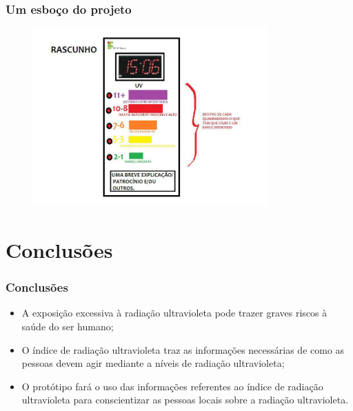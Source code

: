 \documentclass{beamer}
\begin{document}
	\begin{frame}
		\frametitle{Um esboço do projeto}
		\begin{figure}[htb]
					\includegraphics[width=0.8\textwidth]{img/toten_prot.jpg}
				\end{figure}
	\end{frame}
	
	\section{Conclusões}
	\begin{frame}
		\frametitle{Conclusões}
		\begin{itemize}
			\item A exposição excessiva à radiação ultravioleta pode trazer graves riscos à saúde do ser humano;
			\item O índice de radiação ultravioleta traz as informações necessárias de como as pessoas devem agir mediante a níveis de radiação ultravioleta;
			\item O protótipo fará o uso das informações referentes ao índice de radiação ultravioleta para conscientizar as pessoas locais sobre a radiação ultravioleta.
		\end{itemize}

	\end{frame}
	
\end{document}
